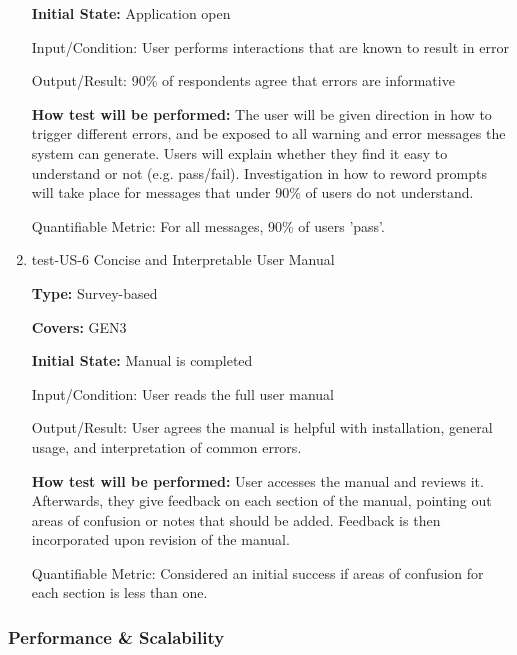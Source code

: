 \documentclass[12pt, titlepage]{article}
\begin{document}
\begin{enumerate}
\textbf{Initial State:} Application open
					
Input/Condition: User performs interactions that are known to result in error
					
Output/Result: 90\% of respondents agree that errors are informative
					
\textbf{How test will be performed:} The user will be given direction in how to trigger different errors, and be exposed to
all warning and error messages the system can generate. Users will explain whether they find it easy to understand
or not (e.g. pass/fail). Investigation in how to reword prompts will take place for messages that under 90\% of users
do not understand.

Quantifiable Metric: For all messages, 90\% of users 'pass'.

\item{test-US-6 Concise and Interpretable User Manual\\}

\textbf{Type:} Survey-based

\textbf{Covers:} GEN3 %
					
\textbf{Initial State:} Manual is completed
					
Input/Condition: User reads the full user manual
					
Output/Result: User agrees the manual is helpful with installation, general usage, and interpretation of common errors.
					
\textbf{How test will be performed:} User accesses the manual and reviews it. Afterwards, they give feedback on each section of 
the manual, pointing out areas of confusion or notes that should be added. Feedback is then incorporated upon revision
of the manual.

Quantifiable Metric: Considered an initial success if areas of confusion for each section is less than one.

\end{enumerate}

\subsubsection{Performance \& Scalability}
\end{document}
